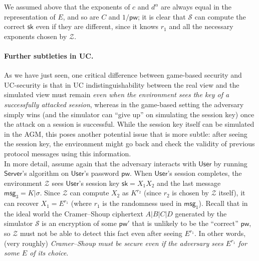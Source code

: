 \documentclass[12pt,a4paper]{article}
\newcommand{\simulator}{\mathcal{S}}
\newcommand{\env}{\mathcal{Z}}
\newcommand{\user}{\mathsf{User}}
\newcommand{\sk}{\mathsf{sk}}
\newcommand{\pw}{\mathsf{pw}}
\newcommand{\server}{\mathsf{Server}}
\newcommand{\msg}[1]{\mathsf{msg}_{#1}}
\begin{document}
We assumed above that the exponents of $c$ and $d^\alpha$ are always equal in the representation of $E$, and so are $C$ and $1/\pw$; it is clear that $\simulator$ can compute the correct $\sk$ even if they are different, since it knows $r_1$ and all the necessary exponents chosen by $\env$.

\paragraph{Further subtleties in UC.}
As we have just seen, one critical difference between game-based security and UC-security is that in UC indistinguishability between the real view and the simulated view must remain \emph{even when the environment sees the key of a successfully attacked session}, whereas in the game-based setting the adversary simply wins (and the simulator can ``give up'' on simulating the session key) once the attack on a session is successful. While the session key itself can be simulated in the AGM, this poses another potential issue that is more subtle: after seeing the session key, the environment might go back and check the validity of previous protocol messages using this information.\\

In more detail, assume again that the adversary interacts with $\user$ by running $\server$'s algorithm on $\user$'s password $\pw$. When $\user$'s session completes, the environment $\env$ sees $\user$'s session key $\sk = X_1X_2$ and the last message $\msg{3} = K|\sigma$. Since $\env$ can compute $X_2$ as $K^{r_2}$ (since $r_2$ is chosen by $\env$ itself), it can recover $X_1 = E^{r_1}$ (where $r_1$ is the randomness used in $\msg{1}$). Recall that in the ideal world the Cramer--Shoup ciphertext $A|B|C|D$ generated by the simulator $\simulator$ is an encryption of some $\pw'$ that is unlikely to be the ``correct'' $\pw$, so $\env$ must not be able to detect this fact even after seeing $E^{r_1}$. In other words, (very roughly) \emph{Cramer--Shoup must be secure even if the adversary sees $E^{r_1}$ for some $E$ of its choice}.\\
\end{document}
